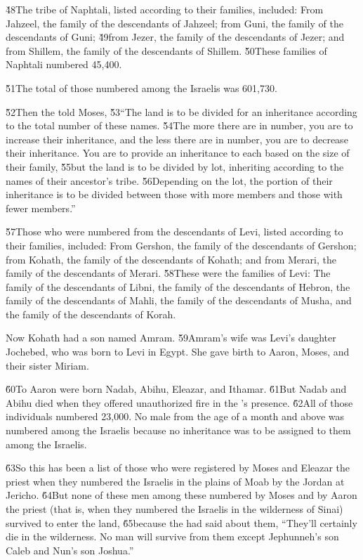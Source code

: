\v{48}The tribe of Naphtali, listed according to their families, included: From Jahzeel, the family of the descendants of Jahzeel; from Guni, the family of the descendants of Guni; \v{49}from Jezer, the family of the descendants of Jezer; and from Shillem, the family of the descendants of Shillem. \v{50}These families of Naphtali numbered 45,400.

\v{51}The total of those numbered among the Israelis was 601,730.

\v{52}Then the  told Moses, \v{53}``The land is to be divided for an inheritance according to the total number of these names. \v{54}The more there are in number, you are to increase their inheritance, and the less there are in number, you are to decrease their inheritance. You are to provide an inheritance to each based on the size of their family, \v{55}but the land is to be divided by lot, inheriting according to the names of their ancestor's tribe. \v{56}Depending on the lot, the portion of their inheritance is to be divided between those with more members and those with fewer members.''

\v{57}Those who were numbered from the descendants of Levi, listed according to their families, included: From Gershon, the family of the descendants of Gershon; from Kohath, the family of the descendants of Kohath; and from Merari, the family of the descendants of Merari. \v{58}These were the families of Levi: The family of the descendants of Libni, the family of the descendants of Hebron, the family of the descendants of Mahli, the family of the descendants of Musha, and the family of the descendants of Korah.

Now Kohath had a son named Amram. \v{59}Amram's wife was Levi's daughter Jochebed, who was born to Levi in Egypt. She gave birth to Aaron, Moses, and their sister Miriam.

\v{60}To Aaron were born Nadab, Abihu, Eleazar, and Ithamar. \v{61}But Nadab and Abihu died when they offered unauthorized fire in the 's presence. \v{62}All of those individuals numbered 23,000. No male from the age of a month and above was numbered among the Israelis because no inheritance was to be assigned to them among the Israelis.

\v{63}So this has been a list of those who were registered by Moses and Eleazar the priest when they numbered the Israelis in the plains of Moab by the Jordan at Jericho. \v{64}But none of these men among these numbered by Moses and by Aaron the priest (that is, when they numbered the Israelis in the wilderness of Sinai) survived to enter the land, \v{65}because the  had said about them, ``They'll certainly die in the wilderness. No man will survive from them except Jephunneh's son Caleb and Nun's son Joshua.''

